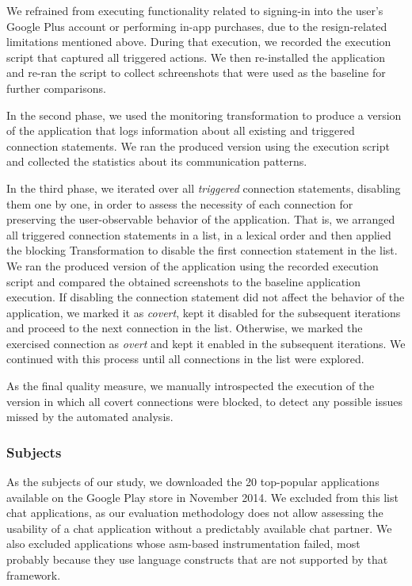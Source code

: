 We refrained from executing functionality related to signing-in into the user's Google Plus account or performing in-app purchases, due to the resign-related limitations mentioned above.
During that execution, we recorded the execution script that captured all triggered actions. 
We then re-installed the application %
and re-ran the script to collect schreenshots that were used as the baseline for further comparisons. 

In the second phase, we used the monitoring transformation to produce a version of the %
application that logs information about all existing and triggered connection statements. We ran the produced version using the execution script and collected the statistics about its communication patterns.  

In the third phase, we iterated over all \emph{triggered} connection statements, disabling them one by one, in order to assess
the necessity of each connection for preserving the user-observable behavior of the application. 
That is, we arranged all triggered connection statements in a list, in a lexical order and then applied the blocking Transformation to disable the first connection statement in the list.   
We ran the produced version of the application using the recorded execution script and compared the obtained screenshots to the baseline application execution. If disabling the connection statement did not affect the behavior of the application, we marked it as \emph{covert}, kept it disabled for the subsequent iterations and proceed to the next connection in the list.
Otherwise, we marked the exercised connection as \emph{overt} and kept it enabled in the subsequent iterations.
We continued with this process until all connections in the list were explored.

As the final quality measure, we manually introspected the execution of the version in which all covert connections
were blocked, to detect any  possible issues missed by the automated analysis.

\subsubsection{Subjects}
As the subjects of our study, we downloaded the 20 top-popular applications available on the Google Play store in November 2014. 
We excluded from this list chat applications, as our evaluation methodology does not allow assessing the usability of a chat application without a predictably available chat partner. 
We also excluded applications whose asm-based instrumentation failed, most probably because they use language constructs that are not supported by that framework.

